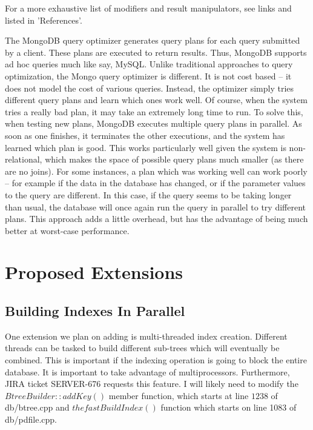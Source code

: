 \documentclass{dependencies/acm_proc_article-sp}
\begin{document}
For a more exhaustive list of modifiers and result manipulators, see links\cite{11} and \cite{12} listed in 'References'.

The MongoDB query optimizer generates query plans for each query submitted by a client.
These plans are executed to return results.
Thus, MongoDB supports ad hoc queries much like say, MySQL.
Unlike traditional approaches to query optimization, the Mongo query optimizer is different.
It is not cost based -- it does not model the cost of various queries.
Instead, the optimizer simply tries different query plans and learn which ones work well.
Of course, when the system tries a really bad plan, it may take an extremely long time to run.
To solve this, when testing new plans, MongoDB executes multiple query plans in parallel.
As soon as one finishes, it terminates the other executions, and the system has learned which plan is good.
This works particularly well given the system is non-relational, which makes the space of possible query plans much smaller (as there are no joins).
For some instances, a plan which was working well can work poorly -- for example if the data in the database has changed, or if the parameter values to the query are different.
In this case, if the query seems to be taking longer than usual, the database will once again run the query in parallel to try different plans.
This approach adds a little overhead, but has the advantage of being much better at worst-case performance. \cite{13}
\section{Proposed Extensions}
\subsection{Building Indexes In Parallel}
One extension we plan on adding is multi-threaded index creation.
Different threads can be tasked to build different sub-trees which will eventually be combined.
This is important if the indexing operation is going to block the entire database.
It is important to take advantage of multiprocessors.
Furthermore, JIRA ticket SERVER-676 requests this feature\cite{8}.
I will likely need to modify the $BtreeBuilder::addKey()$ member function, which starts at line $1238$ of db/btree.cpp and $thefastBuildIndex()$ function which starts on line 1083 of db/pdfile.cpp.
\end{document}

